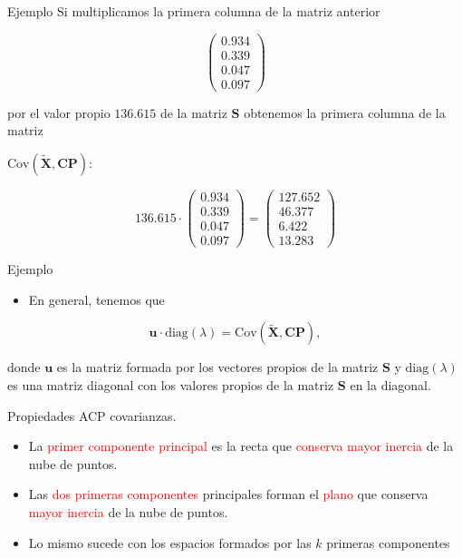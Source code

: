 \documentclass[
  ignorenonframetext,
]{beamer}
\providecommand{\tightlist}{%
  \setlength{\itemsep}{0pt}\setlength{\parskip}{0pt}}
\newcommand\red[1]{\textcolor{red}{#1}}
\begin{document}
\begin{frame}{Ejemplo}
\label{ejemplo-20}
Si multiplicamos la primera columna de la matriz anterior

\[
\begin{pmatrix}
0.934\\ 0.339\\ 0.047\\ 0.097
\end{pmatrix}
\]

por el valor propio \(136.615\) de la matriz \(\mathbf{S}\) obtenemos la
primera columna de la matriz

\(\mbox{Cov}(\tilde{\mathbf{X}},\mathbf{CP})\):

\[
136.615\cdot \begin{pmatrix}0.934\\ 0.339\\ 0.047\\ 0.097\end{pmatrix}=
\begin{pmatrix}
127.652 \\ 46.377 \\ 6.422 \\ 13.283
\end{pmatrix}
\]
\end{frame}

\begin{frame}{Ejemplo}
\label{ejemplo-21}
\begin{itemize}
\tightlist
\item
  En general, tenemos que
\end{itemize}

\[
\mathbf{u}\cdot \mbox{diag}(\lambda) = \mbox{Cov}(\tilde{\mathbf{X}},\mathbf{CP}),
\]

donde \(\mathbf{u}\) es la matriz formada por los vectores propios de la
matriz \(\mathbf{S}\) y \(\mbox{diag}(\lambda)\) es una matriz diagonal
con los valores propios de la matriz \(\mathbf{S}\) en la diagonal.
\end{frame}

\begin{frame}{Propiedades ACP covarianzas.}
\label{propiedades-acp-covarianzas.-4}
\begin{itemize}
\item
  La \red{primer componente principal} es la recta que \red{conserva
  mayor inercia} de la nube de puntos.
\item
  Las \red{dos primeras componentes} principales forman el \red{plano}
  que conserva \red{mayor inercia} de la nube de puntos.
\item
  Lo mismo sucede con los espacios formados por las \(k\) primeras
  componentes
\end{itemize}
\end{frame}
\end{document}
